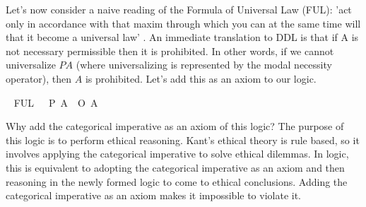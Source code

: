 \begin{isabellebody}
\begin{isamarkuptext}
Let's now consider a naive reading of the Formula of Universal Law (FUL): 'act only in accordance 
with that maxim through which you can at the same time will that it become a universal law' \cite{groundwork}.
An immediate translation to DDL is that if A is not necessary permissible then it is prohibited. In other
words, if we cannot universalize $P A$ (where universalizing is represented by the modal necessity 
operator), then $A$ is prohibited. Let's add this as an axiom to our logic.%
\end{isamarkuptext}\isamarkuptrue%
\isamarkupfalse%
\ \isanewline
FUL{\isacharunderscore}{}{\isacharcolon}\ {\isachardoublequoteopen}{\isasymTurnstile}\ {\isacharparenleft}{\isacharparenleft}\isactrlbold {\isasymnot}{\isacharparenleft}{\isasymbox}\ {\isacharparenleft}P\ A{\isacharparenright}{\isacharparenright}{\isacharparenright}\ \isactrlbold {\isasymrightarrow}\ {\isacharparenleft}O\ {\isacharbraceleft}{\isacharparenleft}\isactrlbold {\isasymnot}A{\isacharparenright}{\isacharbraceright}{\isacharparenright}{\isacharparenright}{\isachardoublequoteclose}%
\begin{isamarkuptext}%
Why add the categorical imperative as an axiom of this logic? The purpose of this logic is to 
perform ethical reasoning. Kant's ethical theory is rule based, so it involves applying the categorical
imperative to solve ethical dilemmas. In logic, this is equivalent to adopting the categorical imperative as 
an axiom and then reasoning in the newly formed logic to come to ethical conclusions. Adding the categorical
imperative as an axiom makes it impossible to violate it. 


\end{isamarkuptext}
\end{isabellebody}
